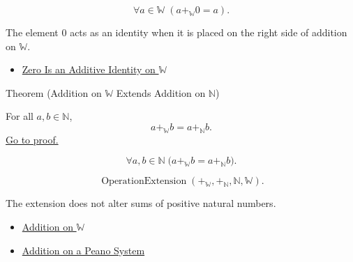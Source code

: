 \begin{remark*}
\[
\forall a\in\mathbb{W}\;(a+_{\mathbb{W}}0=a).
\]
\end{remark*}

\begin{remark*}[Interpretation]
The element $0$ acts as an identity when it is placed on the right side of
addition on $\mathbb{W}$.
\end{remark*}

\begin{dependencies}
\begin{itemize}
  \item \hyperref[thm:zero-additive-identity-on-w]{Zero Is an Additive Identity on $\mathbb{W}$}
\end{itemize}
\end{dependencies}

\begin{theorembox}{Theorem (Addition on \texorpdfstring{$\mathbb{W}$}{W} Extends Addition on \texorpdfstring{$\mathbb{N}$}{N})}
\begin{theorem}
\label{thm:addition-on-w-extends-addition-on-n}
For all $a,b\in\mathbb{N}$,
\[
a+_{\mathbb{W}}b=a+_{\mathbb{N}}b.
\]
\hyperref[prf:addition-on-w-extends-addition-on-n]{Go to proof.}
\end{theorem}
\end{theorembox}

\begin{remark*}
\[
\forall a,b\in\mathbb{N}\;
\bigl(a+_{\mathbb{W}}b=a+_{\mathbb{N}}b\bigr).
\]
\end{remark*}

\begin{remark*}
\[
\operatorname{OperationExtension}
(+_{\mathbb{W}},+_{\mathbb{N}},\mathbb{N},\mathbb{W}).
\]
\end{remark*}

\begin{remark*}[Interpretation]
The extension does not alter sums of positive natural numbers.
\end{remark*}

\begin{dependencies}
\begin{itemize}
  \item \hyperref[def:addition-on-w]{Addition on $\mathbb{W}$}
  \item \hyperref[def:addition-on-peano-system]{Addition on a Peano System}
\end{itemize}
\end{dependencies}

